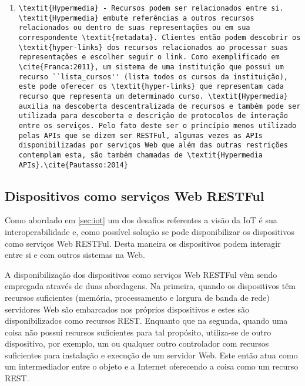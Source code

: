 \begin{enumerate}
\item \begin{verbatim}\textit{Hypermedia} - Recursos podem ser relacionados entre si. \textit{Hypermedia} embute referências a outros recursos relacionados ou dentro de suas representações ou em sua correspondente \textit{metadata}. Clientes então podem descobrir os \textit{hyper-links} dos recursos relacionados ao processar suas representações e escolher seguir o link. Como exemplificado em \cite{Franca:2011}, um sistema de uma instituição que possui um recurso ``lista_cursos'' (lista todos os cursos da instituição), este pode oferecer os \textit{hyper-links} que representam cada recurso que representa um determinado curso. \textit{Hypermedia} auxilia na descoberta descentralizada de recursos e também pode ser utilizada para descoberta e descrição de protocolos de interação entre os serviços. Pelo fato deste ser o princípio menos utilizado pelas APIs que se dizem ser RESTFul, algumas vezes as APIs disponibilizadas por serviços Web que além das outras restrições contemplam esta, são também chamadas de \textit{Hypermedia APIs}.\cite{Pautasso:2014}\end{verbatim}
\end{enumerate}

\subsection{Dispositivos como serviços Web RESTFul} 
\label{subsec:dispositivosWeb}
Como abordado em \ref{sec:iot} um dos desafios referentes a visão da IoT é sua interoperabilidade e, como possível solução se pode disponibilizar os dispositivos como serviços Web RESTFul. Desta maneira os dispositivos podem interagir entre si e com outros sistemas na Web.

A disponibilização dos dispositivos como serviços Web RESTFul vêm sendo empregada através de duas abordagens. Na primeira, quando os dispositivos têm recursos suficientes (memória, processamento e largura de banda de rede) servidores Web são embarcados nos próprios dispositivos e estes são disponibilizados como recursos REST. Enquanto que na segunda, quando uma coisa não possui recursos suficientes para tal propósito, utiliza-se de outro dispositivo, por exemplo, um  ou qualquer outro controlador com recursos suficientes para instalação e execução de um servidor Web. Este então atua como um intermediador entre o objeto e a Internet oferecendo a coisa como um recurso REST.\cite{Franca:2011}

